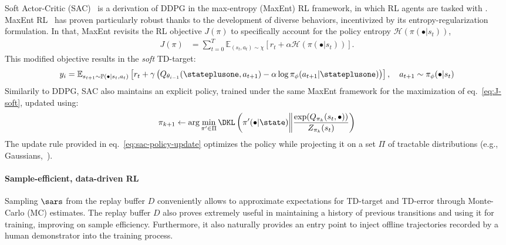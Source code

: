 Soft Actor-Critic (SAC)~\citep{haarnojaSoftActorCriticOffPolicy2018} is a derivation of DDPG in the max-entropy (MaxEnt) RL framework, in which RL agents are tasked with .
MaxEnt RL~\citep{haarnojaReinforcementLearningDeep2017b} has proven particularly robust thanks to the development of diverse behaviors, incentivized by its entropy-regularization formulation.
In that, MaxEnt revisits the RL objective \( J (\pi) \) to specifically account for the policy entropy \( \mathcal H(\pi (\bullet \vert s_t)) \),
\begin{align}
    J(\pi) &= \sum_{t=0}^T \mathbb{E}_{(s_t, a_t) \sim \chi} \left[ r_t + \alpha \mathcal H(\pi (\bullet \vert s_t)) \right].
    \label{eq:J-soft}
\end{align}
This modified objective results in the \emph{soft} TD-target:
\begin{equation}\label{eq:soft-td-target}
    y_i = \mathbb E_{s_{t+1} \sim \mathbb P( \bullet \vert s_t, a_t)} \left[ r_t + \gamma \left( Q_{\theta_{i-1}} (\stateplusone, a_{t+1}) - \alpha \log \pi_\phi(a_{t+1} \vert \stateplusone) \right) \right], \quad a_{t+1} \sim \pi_\phi(\bullet \vert s_t)
\end{equation}
Similarily to DDPG, SAC also maintains an explicit policy, trained under the same MaxEnt framework for the maximization of eq.~\ref{eq:J-soft}, updated using:
\begin{equation}\label{eq:sac-policy-update}
    \pi_{k+1} \leftarrow \arg\min_{\pi^\prime \in \Pi} \DKL \left(\pi^\prime (\bullet \vert \state) \bigg\Vert \frac{\exp(Q_{\pi_k}(s_t, \bullet))}{Z_{\pi_k}(s_t)} \right)
\end{equation}
The update rule provided in eq.~\ref{eq:sac-policy-update} optimizes the policy while projecting it on a set \( \Pi \) of tractable distributions (e.g., Gaussians,~\citet{haarnojaReinforcementLearningDeep2017b}).

\paragraph{Sample-efficient, data-driven RL}
Sampling \( \sars \) from the replay buffer \( D \) conveniently allows to approximate expectations for TD-target and TD-error through Monte-Carlo (MC) estimates.
The replay buffer \( D \) also proves extremely useful in maintaining a history of previous transitions and using it for training, improving on sample efficiency.
Furthermore, it also naturally provides an entry point to inject offline trajectories recorded by a human demonstrator into the training process.

